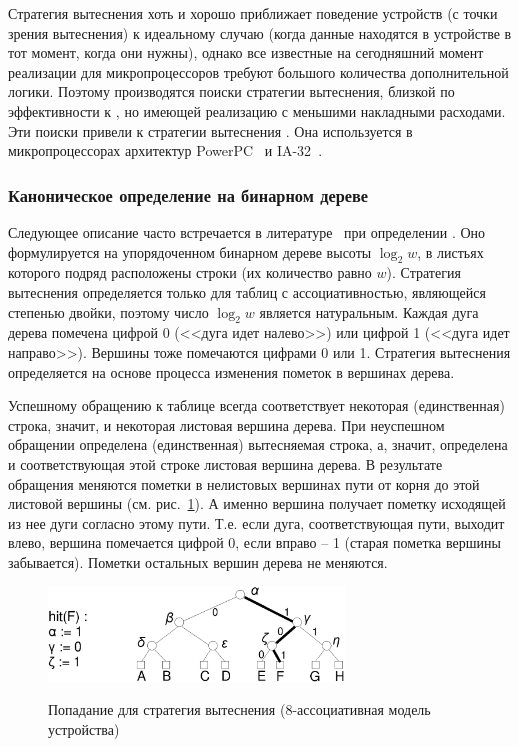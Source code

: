 Стратегия вытеснения \LRU хоть и хорошо приближает поведение устройств (с точки зрения вытеснения) к идеальному случаю (когда данные находятся в устройстве в тот момент, когда они нужны), однако все известные на сегодняшний момент реализации \LRU для микропроцессоров требуют большого количества дополнительной логики. Поэтому производятся поиски стратегии вытеснения, близкой по эффективности к \LRU, но имеющей реализацию с меньшими накладными расходами. Эти поиски привели к стратегии вытеснения \PseudoLRU. Она используется в микропроцессорах архитектур PowerPC~\cite{PowerPC} и IA-32~\cite{FundamentalOfComputerOrganizationAndDesign}.

\subsubsection{Каноническое определение \PseudoLRU на бинарном дереве}

Следующее описание часто встречается в литературе~\cite{FundamentalOfComputerOrganizationAndDesign} при
определении \PseudoLRU. Оно формулируется на упорядоченном бинарном дереве высоты $\log_2 w$, в листьях которого подряд расположены строки (их количество равно $w$). Стратегия вытеснения
\PseudoLRU определяется только для таблиц с ассоциативностью, являющейся степенью двойки, поэтому число $\log_2 w$ является натуральным. Каждая дуга дерева помечена цифрой 0 (<<дуга идет налево>>) или цифрой 1 (<<дуга идет направо>>). Вершины тоже помечаются цифрами 0 или 1. Стратегия вытеснения определяется на основе процесса изменения пометок в вершинах дерева.

Успешному обращению к таблице всегда соответствует некоторая (единственная) строка, значит, и некоторая листовая вершина дерева. При неуспешном обращении определена (единственная) вытесняемая строка, а, значит, определена и соответствующая этой строке листовая вершина дерева. В результате обращения меняются пометки в нелистовых вершинах пути от корня до этой листовой вершины (см. рис.~\ref{pseudo_lru_hit}). А именно вершина получает пометку
исходящей из нее дуги согласно этому пути. Т.е. если дуга, соответствующая пути, выходит влево, вершина помечается цифрой 0, если вправо -- 1 (старая пометка вершины забывается). Пометки остальных вершин дерева не меняются.

\begin{figure}[h] \center
  \includegraphics[width=0.7\textwidth]{2.theor/plruhit}\\
  \caption{Попадание для стратегия вытеснения \PseudoLRU
  (8-ассоциативная модель устройства)}\label{pseudo_lru_hit}
\end{figure}

